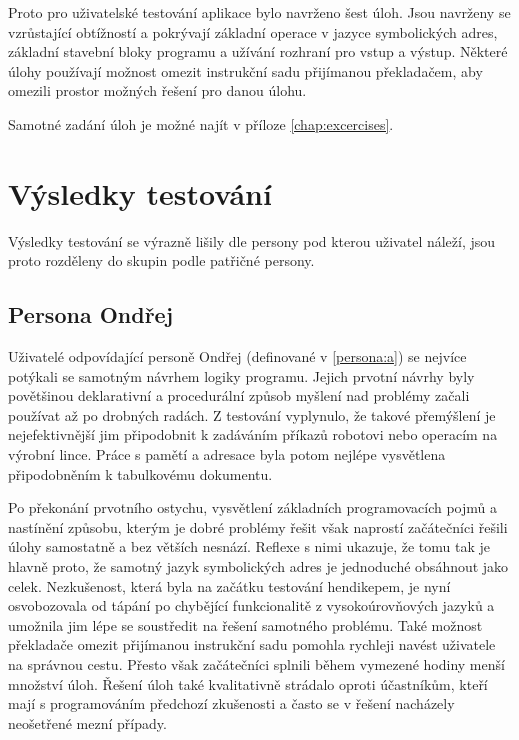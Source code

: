 Proto pro uživatelské testování aplikace bylo navrženo šest úloh. Jsou navrženy se vzrůstající obtížností a pokrývají základní operace v jazyce symbolických adres, základní stavební bloky programu a užívání rozhraní pro vstup a výstup. Některé úlohy používají možnost omezit instrukční sadu přijímanou překladačem, aby omezili prostor možných řešení pro danou úlohu.

Samotné zadání úloh je možné najít v příloze \ref{chap:excercises}.

\section{Výsledky testování}

Výsledky testování se výrazně lišily dle persony pod kterou uživatel náleží, jsou proto rozděleny do skupin podle patřičné persony.

\subsection{Persona Ondřej}

Uživatelé odpovídající personě Ondřej (definované v \ref{persona:a}) se nejvíce potýkali se samotným návrhem logiky programu. Jejich prvotní návrhy byly povětšinou deklarativní a procedurální způsob myšlení nad problémy začali používat až po drobných radách. Z testování vyplynulo, že takové přemýšlení je nejefektivnější jim připodobnit k zadáváním příkazů robotovi nebo operacím na výrobní lince. Práce s pamětí a adresace byla potom nejlépe vysvětlena připodobněním k tabulkovému dokumentu.

Po překonání prvotního ostychu, vysvětlení základních programovacích pojmů a nastínění způsobu, kterým je dobré problémy řešit však naprostí začátečníci řešili úlohy samostatně a bez větších nesnází. Reflexe s nimi ukazuje, že tomu tak je hlavně proto, že samotný jazyk symbolických adres je jednoduché obsáhnout jako celek. Nezkušenost, která byla na začátku testování hendikepem, je nyní osvobozovala od tápání po chybějící funkcionalitě z vysokoúrovňových jazyků a umožnila jim lépe se soustředit na řešení samotného problému. Také možnost překladače omezit přijímanou instrukční sadu pomohla rychleji navést uživatele na správnou cestu. Přesto však začátečníci splnili během vymezené hodiny menší množství úloh. Řešení úloh také kvalitativně strádalo oproti účastníkům, kteří mají s programováním předchozí zkušenosti a často se v řešení nacházely neošetřené mezní případy.


